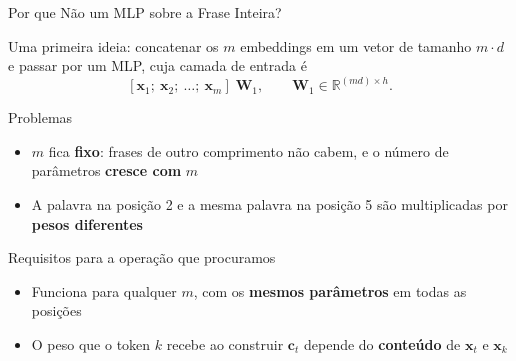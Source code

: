 \documentclass[aspectratio=169,xcolor=dvipsnames]{beamer}
\begin{document}
\begin{frame}{Por que Não um MLP sobre a Frase Inteira?}

Uma primeira ideia: concatenar os $m$ embeddings em um vetor de tamanho $m \cdot d$ e passar por um MLP, cuja camada de entrada é
\[
[\mathbf{x}_1;\ \mathbf{x}_2;\ \dots;\ \mathbf{x}_m]\;\mathbf{W}_1, \qquad \mathbf{W}_1 \in \mathbb{R}^{(m d) \times h}.
\]

\vspace{2pt}

\begin{alertblock}{Problemas}
\begin{itemize}
    \item $m$ fica \textbf{fixo}: frases de outro comprimento não cabem, e o número de parâmetros \textbf{cresce com} $m$
    \item A palavra na posição 2 e a mesma palavra na posição 5 são multiplicadas por \textbf{pesos diferentes}
\end{itemize}
\end{alertblock}

\vspace{4pt}

\begin{block}{Requisitos para a operação que procuramos}
\begin{itemize}
    \item Funciona para qualquer $m$, com os \textbf{mesmos parâmetros} em todas as posições
    \item O peso que o token $k$ recebe ao construir $\mathbf{c}_t$ depende do \textbf{conteúdo} de $\mathbf{x}_t$ e $\mathbf{x}_k$
\end{itemize}
\end{block}

\end{frame}

\end{document}
